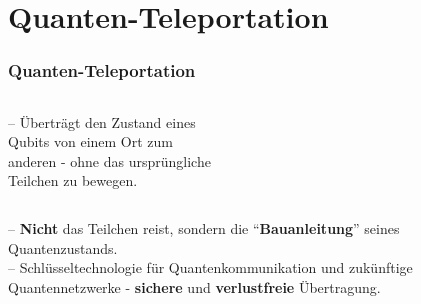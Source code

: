 \section{Quanten-Teleportation}
\begin{frame}
	\frametitle{Quanten-Teleportation}
	\begin{columns}
		\begin{column}{0.48\linewidth}
			-- {\"U}berträgt den Zustand eines\\
				\hspace{0.5em} Qubits von einem Ort zum \\
				\hspace{0.5em} anderen - ohne das urspr{\"u}ngliche\\
				\hspace{0.5em} Teilchen zu bewegen.
		\end{column}
		\begin{column}{0.48\linewidth}
			\vspace{-3em}
		\end{column}
	\end{columns}
	-- \textbf{Nicht} das Teilchen reist, sondern die \enquote{\textbf{Bauanleitung}} seines\\
		\hspace{0.5em} Quantenzustands.\\
	-- Schl{\"u}sseltechnologie f{\"u}r Quantenkommunikation und zuk{\"u}nftige\\
		\hspace{0.5em} Quantennetzwerke - \textbf{sichere} und \textbf{verlustfreie} {\"U}bertragung.
\end{frame}

